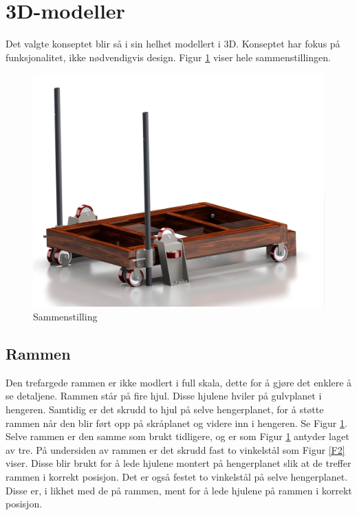 \section{3D-modeller}
Det valgte konseptet blir så i sin helhet modellert i 3D. Konseptet har fokus på funksjonalitet, ikke nødvendigvis design. Figur \ref{F1} viser hele sammenstillingen. 

\begin{figure}[h!]
\centerline{\includegraphics [width=15cm]{images/1.png}}
\caption{Sammenstilling}
\label{F1}
\end{figure}

\subsection{Rammen}
Den trefargede rammen er ikke modlert i full skala, dette for å gjøre det enklere å se detaljene. 
Rammen står på fire hjul. Disse hjulene hviler på gulvplanet i hengeren. Samtidig er det skrudd to hjul på selve hengerplanet, for å støtte rammen når den blir ført opp på skråplanet og videre inn i hengeren. Se Figur \ref{F1}. Selve rammen er den samme som brukt tidligere, og er som Figur \ref{F1} antyder laget av tre. På undersiden av rammen er det skrudd fast to vinkelstål som Figur \ref{F2} viser. Disse blir brukt for å lede hjulene montert på hengerplanet slik at de treffer rammen i korrekt posisjon. 
Det er også festet to vinkelstål på selve hengerplanet. Disse er, i likhet med de på rammen, ment for å lede hjulene på rammen i korrekt posisjon.
 
